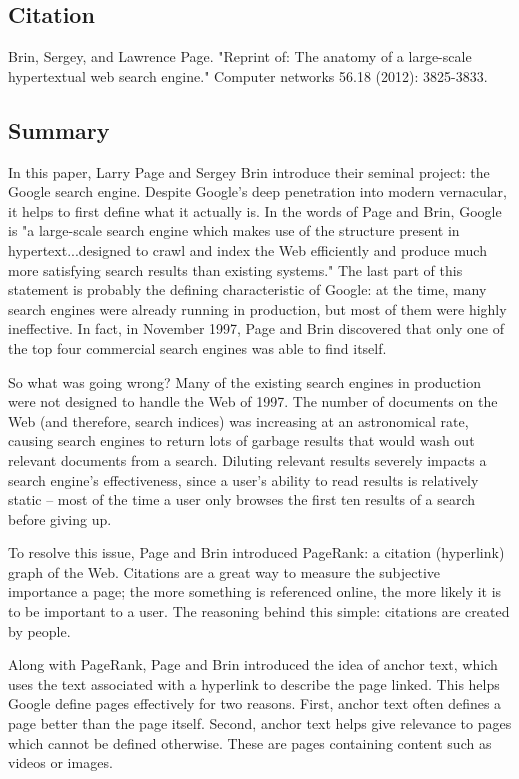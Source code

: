 \documentclass[../summaries.tex]{subfiles}
\begin{document}
\subsection{Citation}
Brin, Sergey, and Lawrence Page. "Reprint of: The anatomy of a large-scale hypertextual web search engine." Computer networks 56.18 (2012): 3825-3833.

\subsection{Summary}
In this paper, Larry Page and Sergey Brin introduce their seminal project:  the Google search engine. Despite Google's deep penetration into modern vernacular, it helps to first define what it actually is. In the words of Page and Brin, Google is "a large-scale search engine which makes use of the structure present in hypertext...designed to crawl and index the Web efficiently and produce much more satisfying search results than existing systems." The last part of this statement is probably the defining characteristic of Google:  at the time, many search engines were already running in production, but most of them were highly ineffective. In fact, in November 1997, Page and Brin discovered that only one of the top four commercial search engines was able to find itself.

So what was going wrong? Many of the existing search engines in production were not designed to handle the Web of 1997. The number of documents on the Web (and therefore, search indices) was increasing at an astronomical rate, causing search engines to return lots of garbage results that would wash out relevant documents from a search. Diluting relevant results severely impacts a search engine's effectiveness, since a user's ability to read results is relatively static -- most of the time a user only browses the first ten results of a search before giving up.

To resolve this issue, Page and Brin introduced PageRank: a citation (hyperlink) graph of the Web. Citations are a great way to measure the subjective importance a page; the more something is referenced online, the more likely it is to be important to a user. The reasoning behind this simple: citations are created by people.

Along with PageRank, Page and Brin introduced the idea of anchor text, which uses the text associated with a hyperlink to describe the page linked. This helps Google define pages effectively for two reasons. First, anchor text often defines a page better than the page itself. Second, anchor text helps give relevance to pages which cannot be defined otherwise. These are pages containing content such as videos or images.
	
\end{document}
